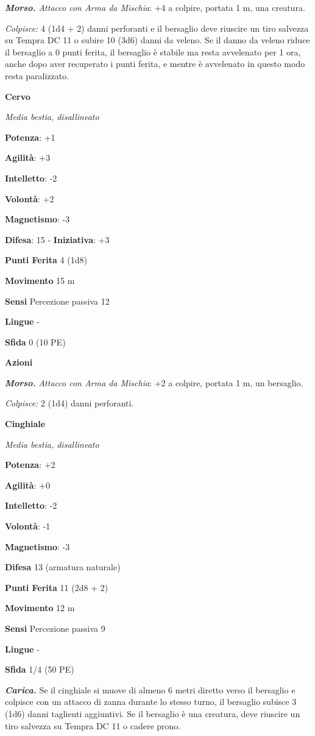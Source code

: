 \begin{multicols}{2}
\emph{\textbf{Morso.} Attacco con Arma da Mischia}: +4 a colpire,
portata 1 m, una creatura.

\emph{Colpisce:} 4 (1d4 + 2) danni perforanti e il bersaglio deve
riuscire un tiro salvezza su Tempra DC 11 o subire 10 (3d6) danni
da veleno. Se il danno da veleno riduce il bersaglio a 0 punti ferita,
il bersaglio è stabile ma resta avvelenato per 1 ora, anche dopo aver
recuperato i punti ferita, e mentre è avvelenato in questo modo resta
paralizzato.

\textbf{Cervo}

\emph{Media bestia, disallineato}

\textbf{Potenza}: +1

\textbf{Agilità}: +3

\textbf{Intelletto}: -2

\textbf{Volontà}: +2

\textbf{Magnetismo}: -3

\textbf{Difesa}: 15 - \textbf{Iniziativa}: +3

\textbf{Punti Ferita} 4 (1d8)

\textbf{Movimento} 15 m

\textbf{Sensi} Percezione passiva 12

\textbf{Lingue} -

\textbf{Sfida} 0 (10 PE)\smallskip

\smallskip\textbf{Azioni}

\emph{\textbf{Morso.} Attacco con Arma da Mischia}: +2 a colpire,
portata 1 m, un bersaglio.

\emph{Colpisce:} 2 (1d4) danni perforanti.

\textbf{Cinghiale}

\emph{Media bestia, disallineato}

\textbf{Potenza}: +2

\textbf{Agilità}: +0

\textbf{Intelletto}: -2

\textbf{Volontà}: -1

\textbf{Magnetismo}: -3

\textbf{Difesa} 13 (armatura naturale)

\textbf{Punti Ferita} 11 (2d8 + 2)

\textbf{Movimento} 12 m

\textbf{Sensi} Percezione passiva 9

\textbf{Lingue} -

\textbf{Sfida} 1/4 (50 PE)\smallskip

\emph{\textbf{Carica.}} Se il cinghiale si muove di almeno 6 metri
diretto verso il bersaglio e colpisce con un attacco di zanna durante lo
stesso turno, il bersaglio subisce 3 (1d6) danni taglienti aggiuntivi.
Se il bersaglio è una creatura, deve riuscire un tiro salvezza su Tempra
DC 11 o cadere prono.


\end{multicols}
